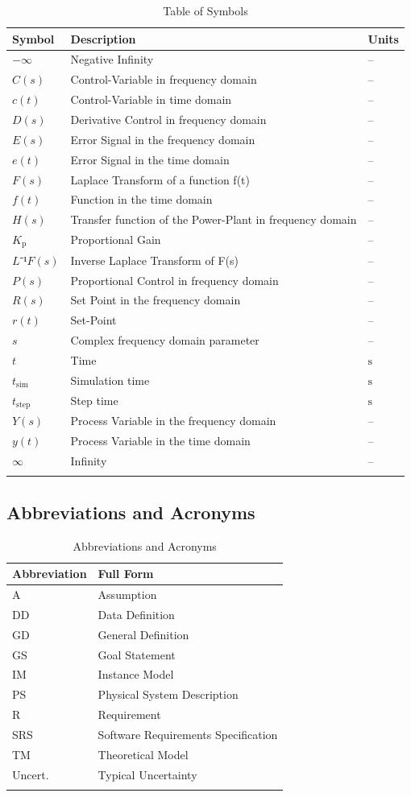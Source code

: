 \documentclass[12pt]{article}
\begin{document}
\begin{longtabu}{l X[l] l}
\toprule
\textbf{Symbol} & \textbf{Description} & \textbf{Units}
\\
\midrule
\endhead
$-∞$ & Negative Infinity & --
\\
$C(s)$ & Control-Variable in frequency domain & --
\\
$c(t)$ & Control-Variable in time domain & --
\\
$D(s)$ & Derivative Control in frequency domain & --
\\
$E(s)$ & Error Signal in the frequency domain & --
\\
$e(t)$ & Error Signal in the time domain & --
\\
$F(s)$ & Laplace Transform of a function f(t) & --
\\
$f(t)$ & Function in the time domain & --
\\
$H(s)$ & Transfer function of the Power-Plant in frequency domain & --
\\
${K_{\text{p}}}$ & Proportional Gain & --
\\
$L⁻¹{F(s)}$ & Inverse Laplace Transform of F(s) & --
\\
$P(s)$ & Proportional Control in frequency domain & --
\\
$R(s)$ & Set Point in the frequency domain & --
\\
$r(t)$ & Set-Point & --
\\
$s$ & Complex frequency domain parameter & --
\\
$t$ & Time & ${\text{s}}$
\\
${t_{\text{sim}}}$ & Simulation time & ${\text{s}}$
\\
${t_{\text{step}}}$ & Step time & ${\text{s}}$
\\
$Y(s)$ & Process Variable in the frequency domain & --
\\
$y(t)$ & Process Variable in the time domain & --
\\
$∞$ & Infinity & --
\\
\bottomrule
\caption{Table of Symbols}
\label{Table:ToS}
\end{longtabu}
\subsection{Abbreviations and Acronyms}
\label{Sec:TAbbAcc}
\begin{longtable}{l l}
\toprule
\textbf{Abbreviation} & \textbf{Full Form}
\\
\midrule
\endhead
A & Assumption
\\
DD & Data Definition
\\
GD & General Definition
\\
GS & Goal Statement
\\
IM & Instance Model
\\
PS & Physical System Description
\\
R & Requirement
\\
SRS & Software Requirements Specification
\\
TM & Theoretical Model
\\
Uncert. & Typical Uncertainty
\\
\bottomrule
\caption{Abbreviations and Acronyms}
\label{Table:TAbbAcc}
\end{longtable}
\end{document}
